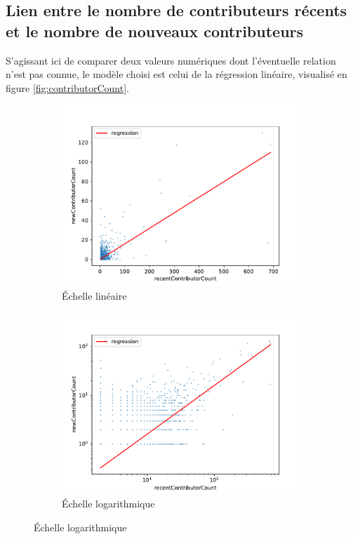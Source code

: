 \documentclass[dvipsnames,runningheads]{llncs}
\begin{document}
    \subsection{Lien entre le nombre de contributeurs récents et le nombre de nouveaux contributeurs}

    S'agissant ici de comparer deux valeurs numériques dont l'éventuelle relation n'est pas connue, le modèle
    choisi est celui de la régression linéaire, visualisé en figure \ref{fig:contributorCount}.

    \begin{figure}
        \centering
        \begin{subfigure}[t]{0.5\textwidth}
            \includegraphics[width=\textwidth]{../experiment/data_analysis/recentContributorCountRegression_linearScale}
            \caption{Échelle linéaire}
        \end{subfigure}%
        \begin{subfigure}[t]{0.5\textwidth}
            \includegraphics[width=\textwidth]{../experiment/data_analysis/recentContributorCountRegression_logScale}
            \caption{Échelle logarithmique}
        \end{subfigure}


\end{figure}
\end{document}
